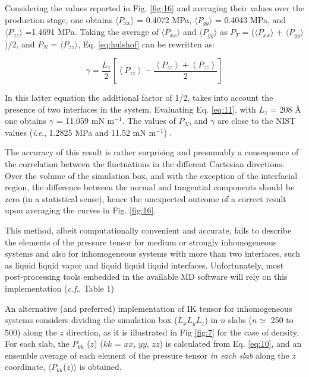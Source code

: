 \documentclass[9pt,bestpractices]{livecoms}
\begin{document}
Considering the values reported in Fig. \ref{fig:16} and averaging their values
over the production stage, one obtains ${\langle}P_{xx}{\rangle}$
= 0.4072 MPa, ${\langle}P_{yy}{\rangle}$  = 0.4043 MPa, and
${\langle}P_{zz}{\rangle}$ =1.4691 MPa. Taking the average of
${\langle}P_{xx}{\rangle}$ and
${\langle}P_{yy}{\rangle}$ as $P_{T}$
= (${\langle}P_{xx}{\rangle}$
+ ${\langle}P_{yy}{\rangle}$)/2, and $P_{N}$
= ${\langle}P_{zz}{\rangle}$, Eq. \ref{eq:hulshof} can be rewritten as:

\begin{equation}
\gamma=\frac{L_{z}}{2}\left[\left\langle P_{zz}\right\rangle -\frac{\left\langle P_{zz}\right\rangle +\left\langle P_{zz}\right\rangle }{2}\right]
  \label{eq:11}
\end{equation}

In this latter equation the additional factor of 1/2, takes into account the
presence of  two interfaces in the system. Evaluating Eq. \ref{eq:11}, with
$L_{z}$ = 208 \AA{} one obtains ${\gamma}$ = 11.059 mN m$^{-1}$. The values of
$P_{N}$, and ${\gamma}$ are close to the NIST values (\textit{i.e}.,
1.2825 MPa and 11.52 mN m$^{-1}$) \citep{lemmon2013}.

The accuracy of this result
is rather surprising and presumably a consequence of the correlation between the
fluctuations in the different Cartesian directions. Over the volume of the simulation
box, and with the exception of the interfacial region, the difference between the
normal and tangential components should be zero (in a statistical sense), hence the unexpected
outcome of a correct result upon averaging the curves in Fig. \ref{fig:16}.

This method, albeit computationally convenient and accurate, fails to describe the elements of the pressure
tensor for medium or strongly inhomogeneous systems and also for inhomogeneous
systems with more than two interfaces, such as liquid \textendash{} liquid
\textendash{} vapor and liquid \textendash{} liquid \textendash{} liquid
interfaces. Unfortunately, most post-processing tools embedded in the available MD software
will rely on this implementation (\textit{c.f}., Table 1)

An alternative (and preferred) implementation of IK tensor for inhomogeneous
systems considers dividing the simulation box
($L_{x}L_{y}L_{z}$) in $n$ slabs
($n{\simeq}$ 250 to 500) along the $z$ direction, as it is
illustrated in Fig \ref{fig:7} for the case of density. For each slab, the
$P_{kk}$ ($z$) ($kk$ = $xx$, $yy$,
$zz$) is calculated from Eq. \ref{eq:10}, and an ensemble average of each element
of the pressure tensor \textit{in each slab} along the $z$ coordinate,
${\langle}P_{kk}$($z$)${\rangle}$ is obtained. 
\end{document}
